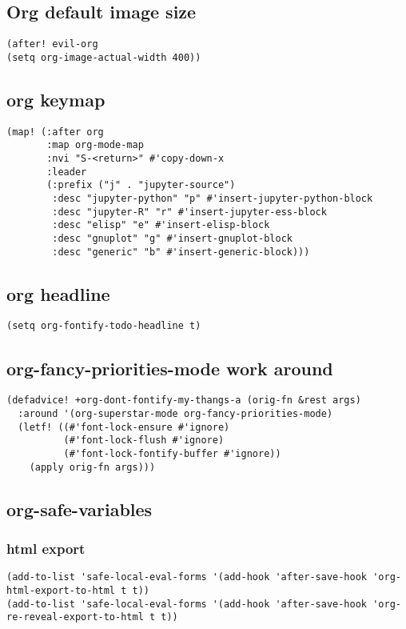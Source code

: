 \documentclass[11pt]{article}
\begin{document}
\subsection{Org default image size}
\label{sec:orgc265e50}
\begin{verbatim}
(after! evil-org
(setq org-image-actual-width 400))
\end{verbatim}

\subsection{org keymap}
\label{sec:orgd79c6df}
\begin{verbatim}
(map! (:after org
       :map org-mode-map
       :nvi "S-<return>" #'copy-down-x
       :leader
       (:prefix ("j" . "jupyter-source")
        :desc "jupyter-python" "p" #'insert-jupyter-python-block
        :desc "jupyter-R" "r" #'insert-jupyter-ess-block
        :desc "elisp" "e" #'insert-elisp-block
        :desc "gnuplot" "g" #'insert-gnuplot-block
        :desc "generic" "b" #'insert-generic-block)))
\end{verbatim}

\subsection{org headline}
\label{sec:org0949b54}
\begin{verbatim}
(setq org-fontify-todo-headline t)
\end{verbatim}
\subsection{org-fancy-priorities-mode work around}
\label{sec:org89b0037}
\begin{verbatim}
(defadvice! +org-dont-fontify-my-thangs-a (orig-fn &rest args)
  :around '(org-superstar-mode org-fancy-priorities-mode)
  (letf! ((#'font-lock-ensure #'ignore)
          (#'font-lock-flush #'ignore)
          (#'font-lock-fontify-buffer #'ignore))
    (apply orig-fn args)))
\end{verbatim}
\subsection{org-safe-variables}
\label{sec:org000f7c9}
\subsubsection{html export}
\label{sec:org903b854}
\begin{verbatim}
(add-to-list 'safe-local-eval-forms '(add-hook 'after-save-hook 'org-html-export-to-html t t))
(add-to-list 'safe-local-eval-forms '(add-hook 'after-save-hook 'org-re-reveal-export-to-html t t))
\end{verbatim}
\end{document}
